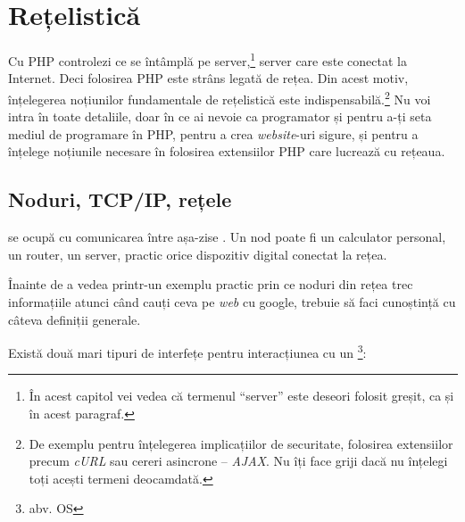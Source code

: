 \chapter{Rețelistică}

\begin{chapsummary}
Cu PHP controlezi ce se întâmplă pe server,\footnote{În acest
capitol vei vedea că termenul ``server'' este deseori folosit greșit,
ca și în acest paragraf.} server care
este conectat la Internet.
Deci folosirea PHP este strâns legată
de rețea. Din acest motiv, înțelegerea noțiunilor fundamentale de
rețelistică este indispensabilă.\footnote{De exemplu pentru 
înțelegerea implicațiilor de securitate, folosirea extensiilor
precum \textsl{cURL} sau cereri asincrone -- \textsl{AJAX}. Nu îți face griji dacă
nu înțelegi toți acești termeni deocamdată.}
Nu voi intra în toate detaliile, doar în ce ai nevoie ca programator
și pentru a-ți seta mediul de programare în PHP, pentru a crea
\textsl{website}-uri sigure, și pentru a înțelege noțiunile
necesare în folosirea extensiilor PHP care lucrează cu rețeaua.
\end{chapsummary}


\section{Noduri, TCP/IP, rețele}
 se ocupă cu comunicarea între
așa-zise . Un nod poate fi un calculator
personal, un router, un server, practic orice dispozitiv digital
conectat la rețea.

Înainte de a vedea printr-un exemplu practic prin ce noduri
din rețea trec informațiile
atunci când cauți ceva pe \textsl{web} cu google, trebuie să faci
cunoștință cu câteva definiții generale.

Există două mari tipuri de interfețe pentru interacțiunea cu un 
\footnote{abv. OS}:

